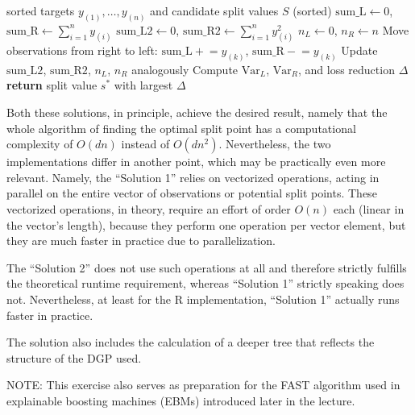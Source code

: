 {\begin{algorithm}[H]
\caption{Efficient split search -- running sums (complexity: $O(n)$)}
\begin{algorithmic}[1]
\Require sorted targets $y_{(1)}, \ldots, y_{(n)}$ and candidate split values $S$ (sorted)
\State $\text{sum\_L} \gets 0$, \quad $\text{sum\_R} \gets \sum_{i=1}^{n} y_{(i)}$ 
\State $\text{sum\_L2} \gets 0$, \quad $\text{sum\_R2} \gets \sum_{i=1}^{n} y_{(i)}^2$
\State $n_L \gets 0$, \quad $n_R \gets n$
    \State Move observations from right to left: $\text{sum\_L} \mathrel{+}= y_{(k)}$, $\text{sum\_R} \mathrel{-}= y_{(k)}$ 
    \State Update $\text{sum\_L2}$, $\text{sum\_R2}$, $n_L$, $n_R$ analogously
    \State Compute $\text{Var}_L$, $\text{Var}_R$, and loss reduction $\Delta$
\EndFor
\State \textbf{return} split value $s^*$ with largest $\Delta$
\end{algorithmic}
\end{algorithm}

Both these solutions, in principle, achieve the desired result, namely that the whole algorithm of finding the optimal split point has a computational complexity of $O(dn)$ instead of $O(d n^2)$.
Nevertheless, the two implementations differ in another point, which may be practically even more relevant.
Namely, the ``Solution 1'' relies on vectorized operations, acting in parallel on the entire vector of observations or potential split points. These vectorized operations, in theory, require an effort of order $O(n)$ each (linear in the vector's length), because they perform one operation per vector element, but they are much faster in practice due to parallelization.

The ``Solution 2'' does not use such operations at all and therefore strictly fulfills the theoretical runtime requirement, whereas ``Solution 1'' strictly speaking does not.
Nevertheless, at least for the R implementation, ``Solution 1'' actually runs faster in practice.

The solution also includes the calculation of a deeper tree that reflects the structure of the DGP used.

NOTE: This exercise also serves as preparation for the FAST algorithm used in explainable boosting machines (EBMs) introduced later in the lecture.

}